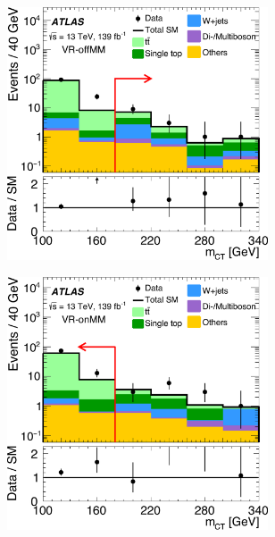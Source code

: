 \begin{figure}
\begin{subfigure}[b]{0.5\linewidth}
		\centering\includegraphics[width=0.85\textwidth]{OneLeptonbb_VR_UnderFlowBin_VRtt2offnomct2EM_mct2_yellow}
	\end{subfigure}\hfill
	\begin{subfigure}[b]{0.5\linewidth}
		\centering\includegraphics[width=0.85\textwidth]{OneLeptonbb_VR_UnderFlowBin_VRtt2onnomct2EM_mct2_yellow}
	\end{subfigure}\hfill
	\begin{subfigure}[b]{0.5\linewidth}

\end{subfigure}
\end{figure}
